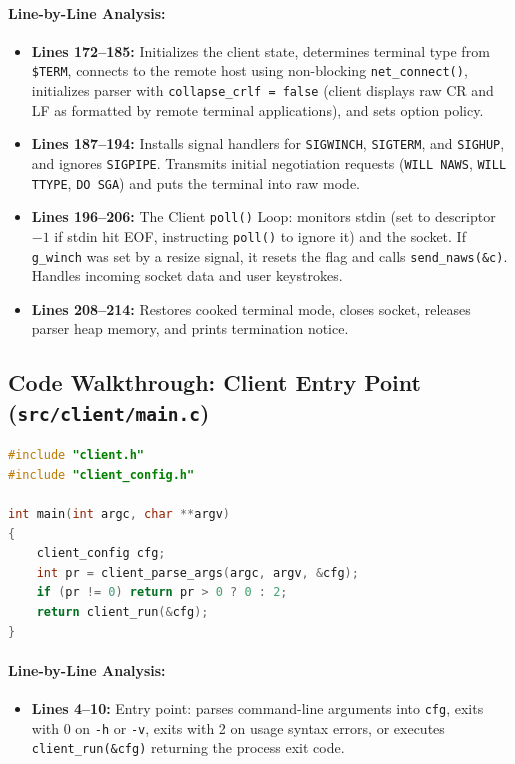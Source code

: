 \paragraph{Line-by-Line Analysis:}
\begin{itemize}[leftmargin=1.5em]
    \item \textbf{Lines 172--185:} Initializes the client state, determines terminal type from \texttt{\$TERM}, connects to the remote host using non-blocking \texttt{net\_connect()}, initializes parser with \texttt{collapse\_crlf = false} (client displays raw CR and LF as formatted by remote terminal applications), and sets option policy.
    \item \textbf{Lines 187--194:} Installs signal handlers for \texttt{SIGWINCH}, \texttt{SIGTERM}, and \texttt{SIGHUP}, and ignores \texttt{SIGPIPE}. Transmits initial negotiation requests (\texttt{WILL NAWS}, \texttt{WILL TTYPE}, \texttt{DO SGA}) and puts the terminal into raw mode.
    \item \textbf{Lines 196--206:} The Client \texttt{poll()} Loop: monitors stdin (set to descriptor $-1$ if stdin hit EOF, instructing \texttt{poll()} to ignore it) and the socket. If \texttt{g\_winch} was set by a resize signal, it resets the flag and calls \texttt{send\_naws(\&c)}. Handles incoming socket data and user keystrokes.
    \item \textbf{Lines 208--214:} Restores cooked terminal mode, closes socket, releases parser heap memory, and prints termination notice.
\end{itemize}

\subsection{Code Walkthrough: Client Entry Point (\texttt{src/client/main.c})}

\begin{lstlisting}[language=C]
#include "client.h"
#include "client_config.h"

int main(int argc, char **argv)
{
    client_config cfg;
    int pr = client_parse_args(argc, argv, &cfg);
    if (pr != 0) return pr > 0 ? 0 : 2;
    return client_run(&cfg);
}
\end{lstlisting}

\paragraph{Line-by-Line Analysis:}
\begin{itemize}[leftmargin=1.5em]
    \item \textbf{Lines 4--10:} Entry point: parses command-line arguments into \texttt{cfg}, exits with 0 on \texttt{-h} or \texttt{-v}, exits with 2 on usage syntax errors, or executes \texttt{client\_run(\&cfg)} returning the process exit code.
\end{itemize}

